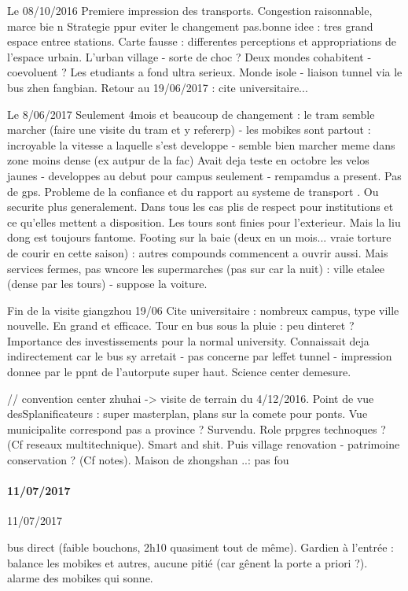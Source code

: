 Le 08/10/2016
Premiere impression des transports. Congestion raisonnable, marce bie
n
Strategie ppur eviter le changement pas.bonne idee : tres grand espace entree stations. Carte fausse : differentes perceptions et appropriations de l'espace urbain. L'urban village - sorte de choc ?
Deux mondes cohabitent - coevoluent ? Les etudiants a fond ultra serieux. Monde isole - liaison tunnel via le bus zhen fangbian.
Retour au 19/06/2017 : cite universitaire...


Le 8/06/2017
Seulement 4mois et beaucoup de changement : le tram semble marcher (faire une visite du tram et y refererp) - les mobikes sont partout : incroyable la vitesse a laquelle s'est developpe - semble bien marcher meme dans zone moins dense (ex autpur de la fac)
Avait deja teste en octobre les velos jaunes - developpes au debut pour campus seulement - rempamdus a present. Pas de gps. Probleme de la confiance et du rapport au systeme de transport . Ou securite plus generalement. Dans tous les cas plis de respect pour institutions et ce qu'elles mettent a disposition. Les tours sont finies pour l'exterieur. Mais la liu dong est toujours fantome.
Footing sur la baie (deux en un mois... vraie torture de courir en cette saison) : autres compounds commencent a ouvrir aussi. Mais services fermes, pas wncore les supermarches (pas sur car la nuit) : ville etalee (dense par les tours) - suppose la voiture.

Fin de la visite giangzhou 19/06
Cite universitaire : nombreux campus, type ville nouvelle. En grand et efficace. Tour en bus sous la pluie : peu dinteret ? Importance des investissements pour la normal university.
Connaissait deja indirectement car le bus sy arretait - pas concerne par leffet tunnel - impression donnee par le ppnt de l'autorpute super haut. Science center demesure.

// convention center zhuhai -> visite de terrain du 4/12/2016.
Point de vue desSplanificateurs : super masterplan, plans sur la comete pour ponts. Vue municipalite correspond pas a province ? Survendu. Role prpgres technoques ? (Cf reseaux multitechnique). Smart and shit. Puis village renovation - patrimoine conservation ? (Cf notes). Maison de zhongshan ..: pas fou


\paragraph{11/07/2017}{11/07/2017}

bus direct (faible bouchons, 2h10 quasiment tout de même). Gardien à l'entrée : balance les mobikes et autres, aucune pitié (car gênent la porte a priori ?). alarme des mobikes qui sonne.



